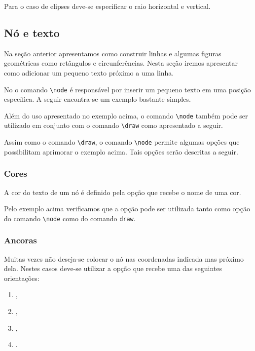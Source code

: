 Para o caso de elipses deve-se especificar o raio horizontal e vertical. \\

\subsection{Nó e texto}
Na seção anterior apresentamos como construir linhas e algumas figuras geométricas como retângulos e circunferências. Nesta seção iremos apresentar como adicionar um pequeno texto próximo a uma linha.

No \TikZ o comando \lstinline!\node! é responsável por inserir um pequeno texto em uma posição específica. A seguir encontra-se um exemplo bastante simples. \\

Além do uso apresentado no exemplo acima, o comando \lstinline!\node! também pode ser utilizado em conjunto com o comando \lstinline!\draw! como apresentado a seguir. \\

Assim como o comando \lstinline!\draw!, o comando \lstinline!\node! permite algumas opções que possibilitam aprimorar o exemplo acima. Tais opções serão descritas a seguir.

\subsubsection{Cores}
A cor do texto de um nó é definido pela opção  que recebe o nome de uma cor. \\

Pelo exemplo acima verificamos que a opção  pode ser utilizada tanto como opção do comando \lstinline!\node! como do comando \lstinline!draw!.

\subsubsection{Ancoras}
Muitas vezes não deseja-se colocar o nó nas coordenadas indicada mas próximo dela. Nestes casos deve-se utilizar a opção  que recebe uma das seguintes orientações:
\begin{enumerate}
    \item {},
    \item {},
    \item {},
    \item {}.
\end{enumerate}

